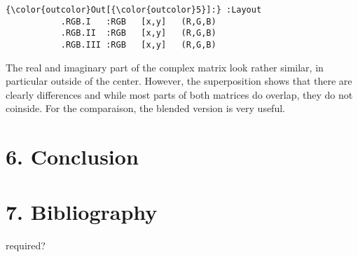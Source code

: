 \documentclass[11pt]{article}
\begin{document}
    
    
    
    
    
    
\begin{Verbatim}[commandchars=\\\{\}]
{\color{outcolor}Out[{\color{outcolor}5}]:} :Layout
           .RGB.I   :RGB   [x,y]   (R,G,B)
           .RGB.II  :RGB   [x,y]   (R,G,B)
           .RGB.III :RGB   [x,y]   (R,G,B)
\end{Verbatim}
            
    The real and imaginary part of the complex matrix look rather similar,
in particular outside of the center. However, the superposition shows
that there are clearly differences and while most parts of both matrices
do overlap, they do not coinside. For the comparaison, the blended
version is very useful.

    \section{6. Conclusion}\label{conclusion}

    \section{7. Bibliography}\label{bibliography}

required?


    
    
    
    
\end{document}
